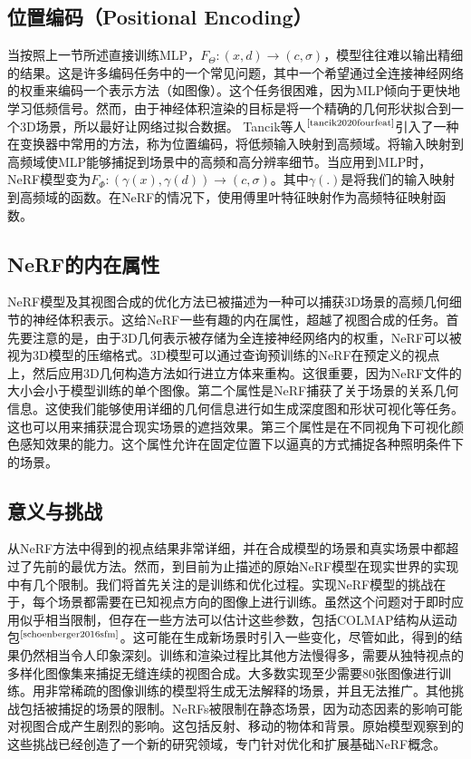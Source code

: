 \documentclass[UTF8,titlepage]{article}
\newcommand{\upcite}[1]{$^{\mbox{\scriptsize \cite{#1}}}$}
\numberwithin{figure}{section}
\begin{document}
\subsection{位置编码（Positional Encoding）}

当按照上一节所述直接训练MLP，$F_{\Theta}:(x,d) \rightarrow (c,\sigma)$，模型往往难以输出精细的结果。这是许多编码任务中的一个常见问题，其中一个希望通过全连接神经网络的权重来编码一个表示方法（如图像）。这个任务很困难，因为MLP倾向于更快地学习低频信号。然而，由于神经体积渲染的目标是将一个精确的几何形状拟合到一个3D场景，所以最好让网络过拟合数据。 Tancik等人\upcite{tancik2020fourfeat}引入了一种在变换器中常用的方法，称为位置编码，将低频输入映射到高频域。将输入映射到高频域使MLP能够捕捉到场景中的高频和高分辨率细节。当应用到MLP时，NeRF模型变为$F_{\Phi}:(\gamma(x),\gamma(d)) \rightarrow (c,\sigma)$。其中$\gamma(.)$是将我们的输入映射到高频域的函数。在NeRF的情况下，使用傅里叶特征映射作为高频特征映射函数。

\subsection{NeRF的内在属性}

NeRF模型及其视图合成的优化方法已被描述为一种可以捕获3D场景的高频几何细节的神经体积表示。这给NeRF一些有趣的内在属性，超越了视图合成的任务。首先要注意的是，由于3D几何表示被存储为全连接神经网络内的权重，NeRF可以被视为3D模型的压缩格式。3D模型可以通过查询预训练的NeRF在预定义的视点上，然后应用3D几何构造方法如行进立方体来重构。这很重要，因为NeRF文件的大小会小于模型训练的单个图像。第二个属性是NeRF捕获了关于场景的关系几何信息。这使我们能够使用详细的几何信息进行如生成深度图和形状可视化等任务。这也可以用来捕获混合现实场景的遮挡效果。第三个属性是在不同视角下可视化颜色感知效果的能力。这个属性允许在固定位置下以逼真的方式捕捉各种照明条件下的场景。

\subsection{意义与挑战}

从NeRF方法中得到的视点结果非常详细，并在合成模型的场景和真实场景中都超过了先前的最优方法。然而，到目前为止描述的原始NeRF模型在现实世界的实现中有几个限制。我们将首先关注的是训练和优化过程。实现NeRF模型的挑战在于，每个场景都需要在已知视点方向的图像上进行训练。虽然这个问题对于即时应用似乎相当限制，但存在一些方法可以估计这些参数，包括COLMAP结构从运动包\upcite{schoenberger2016sfm}。这可能在生成新场景时引入一些变化，尽管如此，得到的结果仍然相当令人印象深刻。训练和渲染过程比其他方法慢得多，需要从独特视点的多样化图像集来捕捉无缝连续的视图合成。大多数实现至少需要80张图像进行训练。用非常稀疏的图像训练的模型将生成无法解释的场景，并且无法推广。其他挑战包括被捕捉的场景的限制。NeRFs被限制在静态场景，因为动态因素的影响可能对视图合成产生剧烈的影响。这包括反射、移动的物体和背景。原始模型观察到的这些挑战已经创造了一个新的研究领域，专门针对优化和扩展基础NeRF概念。
\end{document}
